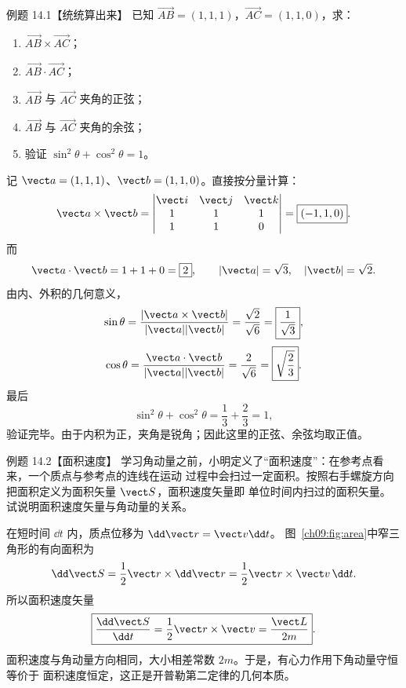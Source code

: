 

\Needspace{0.34\textheight}
\begin{origexamplebox}{例题 14.1【统统算出来】}
已知 $\overrightarrow{AB}=(1,1,1)$，$\overrightarrow{AC}=(1,1,0)$，求：
\begin{enumerate}[label=(\arabic*),leftmargin=2.2em]
  \item $\overrightarrow{AB}\times\overrightarrow{AC}$；
  \item $\overrightarrow{AB}\cdot\overrightarrow{AC}$；
  \item $\overrightarrow{AB}$ 与 $\overrightarrow{AC}$ 夹角的正弦；
  \item $\overrightarrow{AB}$ 与 $\overrightarrow{AC}$ 夹角的余弦；
  \item 验证 $\sin^2\theta+\cos^2\theta=1$。
\end{enumerate}
\end{origexamplebox}

\begin{xesolution}
记 $\vect a=(1,1,1)$、$\vect b=(1,1,0)$。直接按分量计算：
\[
 \vect a\times\vect b
 =\begin{vmatrix}
   \vect i&\vect j&\vect k\\
   1&1&1\\
   1&1&0
  \end{vmatrix}
 =\boxed{(-1,1,0)}.
\]
而
\[
 \vect a\cdot\vect b=1+1+0=\boxed2,
 \qquad
 |\vect a|=\sqrt3,\quad |\vect b|=\sqrt2.
\]
由内、外积的几何意义，
\[
 \sin\theta=\frac{|\vect a\times\vect b|}{|\vect a||\vect b|}
 =\frac{\sqrt2}{\sqrt6}=\boxed{\frac1{\sqrt3}},
\]
\[
 \cos\theta=\frac{\vect a\cdot\vect b}{|\vect a||\vect b|}
 =\frac2{\sqrt6}=\boxed{\sqrt{\frac23}}.
\]
最后
\[
 \sin^2\theta+\cos^2\theta=\frac13+\frac23=1,
\]
验证完毕。由于内积为正，夹角是锐角；因此这里的正弦、余弦均取正值。
\end{xesolution}

\Needspace{0.38\textheight}
\begin{origexamplebox}{例题 14.2【面积速度】}
学习角动量之前，小明定义了“面积速度”：在参考点看来，一个质点与参考点的连线在运动
过程中会扫过一定面积。按照右手螺旋方向把面积定义为面积矢量 $\vect S$，面积速度矢量即
单位时间内扫过的面积矢量。试说明面积速度矢量与角动量的关系。
\areaVelocityDiagram
\end{origexamplebox}

\begin{xesolution}
在短时间 $\dd t$ 内，质点位移为 $\dd\vect r=\vect v\dd t$。
图~\ref{ch09:fig:area}中窄三角形的有向面积为
\[
 \dd\vect S=\frac12\vect r\times\dd\vect r
 =\frac12\vect r\times\vect v\,\dd t.
\]
所以面积速度矢量
\[
 \boxed{\frac{\dd\vect S}{\dd t}
 =\frac12\vect r\times\vect v
 =\frac{\vect L}{2m}}.
\]
面积速度与角动量方向相同，大小相差常数 $2m$。于是，有心力作用下角动量守恒等价于
面积速度恒定，这正是开普勒第二定律的几何本质。
\end{xesolution}

